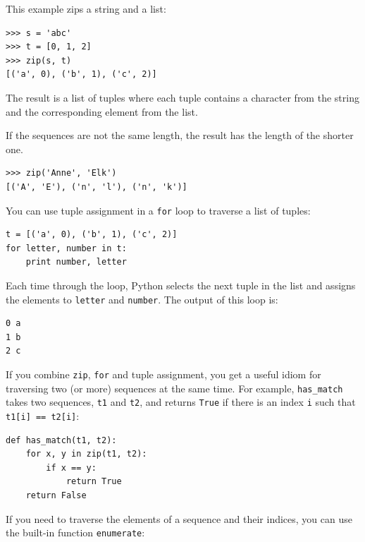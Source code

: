 \documentclass[10pt]{book}
\begin{document}

This example zips a string and a list:

\beforeverb
\begin{verbatim}
>>> s = 'abc'
>>> t = [0, 1, 2]
>>> zip(s, t)
[('a', 0), ('b', 1), ('c', 2)]
\end{verbatim}
\afterverb
%
The result is a list of tuples where each tuple contains
a character from the string and the corresponding element from
the list.


If the sequences are not the same length, the result has the
length of the shorter one.

\beforeverb
\begin{verbatim}
>>> zip('Anne', 'Elk')
[('A', 'E'), ('n', 'l'), ('n', 'k')]
\end{verbatim}
\afterverb
%
You can use tuple assignment in a {\tt for} loop to traverse a list of
tuples:


\beforeverb
\begin{verbatim}
t = [('a', 0), ('b', 1), ('c', 2)]
for letter, number in t:
    print number, letter
\end{verbatim}
\afterverb
%
Each time through the loop, Python selects the next tuple in
the list and assigns the elements to {\tt letter} and 
{\tt number}.  The output of this loop is:


\beforeverb
\begin{verbatim}
0 a
1 b
2 c
\end{verbatim}
\afterverb
%
If you combine {\tt zip}, {\tt for} and tuple assignment, you get a
useful idiom for traversing two (or more) sequences at the same
time.  For example, \verb"has_match" takes two sequences, {\tt t1} and
{\tt t2}, and returns {\tt True} if there is an index {\tt i}
such that {\tt t1[i] == t2[i]}:


\beforeverb
\begin{verbatim}
def has_match(t1, t2):
    for x, y in zip(t1, t2):
        if x == y:
            return True
    return False
\end{verbatim}
\afterverb
%
If you need to traverse the elements of a sequence and their
indices, you can use the built-in function {\tt enumerate}:

\end{document}
